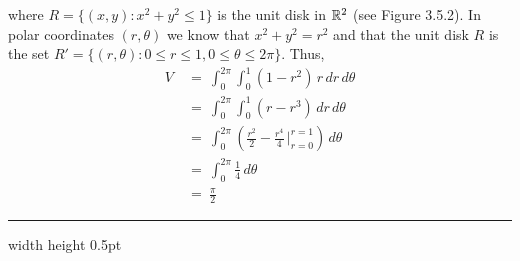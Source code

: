 \begin{exmp}
 where $R = \lbrace (x,y): x^2 + y^2 \le 1 \rbrace$ is the unit disk in $\mathbb{R}^{2}$
 (see Figure 3.5.2). In polar coordinates $(r,\theta)$
 we know that $x^2 + y^2 = r^2$ and that the unit disk $R$ is the set $R' = \lbrace (r,\theta):0 \le r \le 1, 0 \le
 \theta \le 2\pi \rbrace$. Thus,
 \begin{align*}
  V ~&=~ \int_0^{2\pi} \int_0^1 (1 - r^2 )\,r\,dr\,d\theta\\
   &=~ \int_0^{2\pi} \int_0^1 (r - r^3 )\,dr\,d\theta\\
   &=~ \int_0^{2\pi} \left( \tfrac{r^2}{2} - \tfrac{r^4}{4} \,\Big|_{r=0}^{r=1} \right) \,d\theta\\
   &=~ \int_0^{2\pi} \tfrac{1}{4} \,d\theta\\
   &=~ \frac{\pi}{2}
 \end{align*}
\end{exmp}
\hrule width \textwidth height 0.5pt

